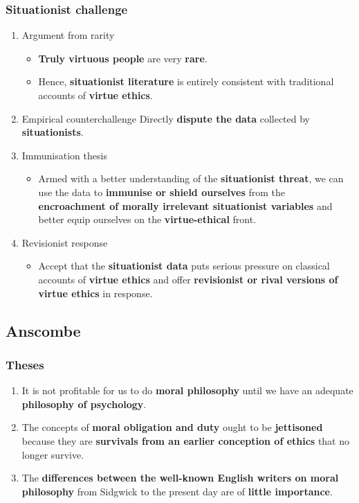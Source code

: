 \documentclass[11pt]{article}
\begin{document}
\subsubsection{Situationist challenge}
\label{sec:orgec285b5}
\begin{enumerate}
\item Argument from rarity
\begin{itemize}
\item \textbf{Truly virtuous people} are very \textbf{rare}.
\item Hence, \textbf{situationist literature} is entirely consistent with traditional accounts of \textbf{virtue ethics}.
\end{itemize}
\item Empirical counterchallenge
Directly \textbf{dispute the data} collected by \textbf{situationists}.
\item Immunisation thesis
\begin{itemize}
\item Armed with a better understanding of the \textbf{situationist threat}, we can use the data to \textbf{immunise or shield ourselves} from the \textbf{encroachment of morally irrelevant situationist variables} and better equip ourselves on the \textbf{virtue-ethical} front.
\end{itemize}
\item Revisionist response
\begin{itemize}
\item Accept that the \textbf{situationist data} puts serious pressure on classical accounts of \textbf{virtue ethics} and offer \textbf{revisionist or rival versions of virtue ethics} in response.
\end{itemize}
\end{enumerate}

 \newpage
\subsection{Anscombe}
\label{sec:org1078732}

\subsubsection{Theses}
\label{sec:org2078b8d}
\begin{enumerate}
\item It is not profitable for us to do \textbf{moral philosophy} until we have an adequate \textbf{philosophy of psychology}.
\item The concepts of \textbf{moral obligation and duty} ought to be \textbf{jettisoned} because they are \textbf{survivals from an earlier conception of ethics} that no longer survive.
\item The \textbf{differences between the well-known English writers on moral philosophy} from Sidgwick to the present day are of \textbf{little importance}.
\end{enumerate}
\end{document}

